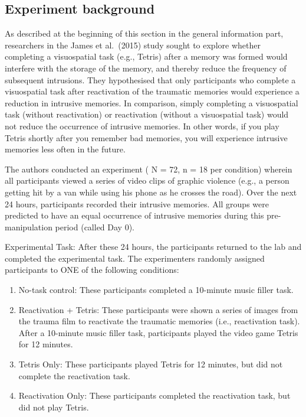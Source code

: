 \documentclass[
]{book}
\begin{document}
\hypertarget{experiment-background-5}{%
\subsection{Experiment background}\label{experiment-background-5}}

As described at the beginning of this section in the general information part, researchers in the James et al.~(2015) study sought to explore whether completing a visuospatial task (e.g., Tetris) after a memory was formed would interfere with the storage of the memory, and thereby reduce the frequency of subsequent intrusions. They hypothesised that only participants who complete a visuospatial task after reactivation of the traumatic memories would experience a reduction in intrusive memories. In comparison, simply completing a visuospatial task (without reactivation) or reactivation (without a visuospatial task) would not reduce the occurrence of intrusive memories. In other words, if you play Tetris shortly after you remember bad memories, you will experience intrusive memories less often in the future.

The authors conducted an experiment ( N = 72, n = 18 per condition) wherein all participants viewed a series of video clips of graphic violence (e.g., a person getting hit by a van while using his phone as he crosses the road). Over the next 24 hours, participants recorded their intrusive memories. All groups were predicted to have an equal occurrence of intrusive memories during this pre-manipulation period (called Day 0).

Experimental Task: After these 24 hours, the participants returned to the lab and completed the experimental task. The experimenters randomly assigned participants to ONE of the following conditions:

\begin{enumerate}
\def\labelenumi{\arabic{enumi}.}
\item
  No-task control: These participants completed a 10-minute music filler task.
\item
  Reactivation + Tetris: These participants were shown a series of images from the trauma film to reactivate the traumatic memories (i.e., reactivation task). After a 10-minute music filler task, participants played the video game Tetris for 12 minutes.
\item
  Tetris Only: These participants played Tetris for 12 minutes, but did not complete the reactivation task.
\item
  Reactivation Only: These participants completed the reactivation task, but did not play Tetris.
\end{enumerate}
\end{document}
